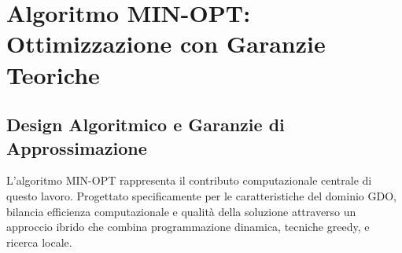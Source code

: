 \section{Algoritmo MIN-OPT: Ottimizzazione con Garanzie Teoriche}

\subsection{Design Algoritmico e Garanzie di Approssimazione}

L'algoritmo MIN-OPT rappresenta il contributo computazionale centrale di questo lavoro. Progettato specificamente per le caratteristiche del dominio GDO, bilancia efficienza computazionale e qualità della soluzione attraverso un approccio ibrido che combina programmazione dinamica, tecniche greedy, e ricerca locale.


